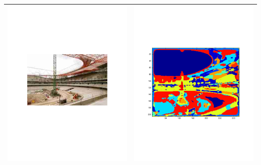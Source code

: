 \documentclass[12pt]{article}
\begin{document}
\begin{longtable}{| c | c |}
  \includegraphics[trim=40mm 40mm 40mm 40mm,clip=true,width=0.45\linewidth]{images/stadium_1.pdf} & \includegraphics[trim=25mm 25mm 25mm 25mm,clip=true,width=0.45\linewidth]{images/stadium_2.pdf} \\
  \hline

\end{longtable}
\end{document}
